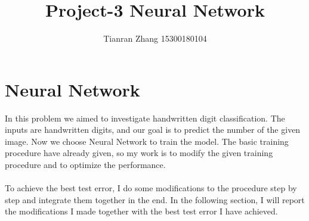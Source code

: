 \documentclass[12pt]{article}
\author{ Tianran Zhang 15300180104}
\title{Project-3 Neural Network}
\begin{document}
\maketitle
\tableofcontents
\section{Neural Network}	
	In this problem we aimed to investigate handwritten digit classification. The inputs are handwritten digits, and our goal is to predict the number of the given image. Now we choose Neural Network to train the model. The basic training procedure have already given, so my work is to modify the given training procedure  and to optimize the performance.\\\\
To achieve the best test error, I do some modifications to the procedure step by step and integrate them together in the end. In the following section, I will report the modifications I made together with the best test error I have achieved. 
\end{document}

